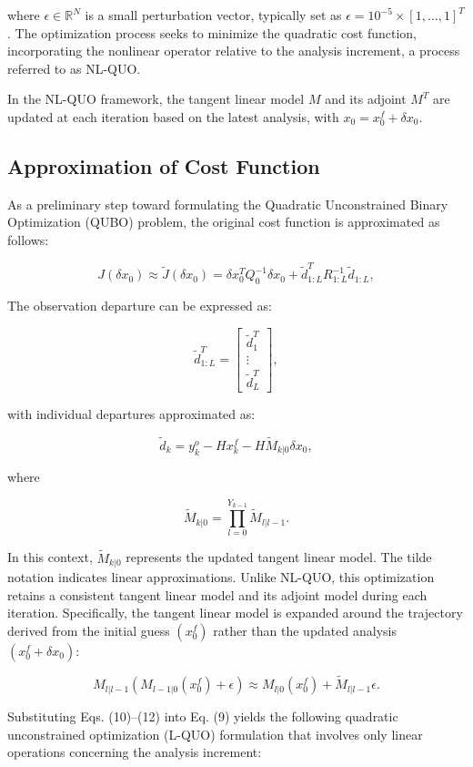 \documentclass{article}
\begin{document}
where \( \epsilon \in \mathbb{R}^N \) is a small perturbation vector, typically set as \( \epsilon = 10^{-5} \times [1,\ldots,1]^T \). The optimization process seeks to minimize the quadratic cost function, incorporating the nonlinear operator relative to the analysis increment, a process referred to as NL-QUO.

In the NL-QUO framework, the tangent linear model \( M \) and its adjoint \( M^T \) are updated at each iteration based on the latest analysis, with \( x_0 = x^f_0 + \delta x_0 \).

\subsection{Approximation of Cost Function}

As a preliminary step toward formulating the Quadratic Unconstrained Binary Optimization (QUBO) problem, the original cost function is approximated as follows:

\[
J (\delta x_0) \approx \tilde{J}(\delta x_0) = \delta x_0^T Q_0^{-1} \delta x_0 + \tilde{d}_{1:L}^T R_{1:L}^{-1} \tilde{d}_{1:L},
\]

The observation departure can be expressed as:

\[
\tilde{d}_{1:L}^T = \begin{bmatrix}
\tilde{d}_1^T \\
\vdots \\
\tilde{d}_L^T
\end{bmatrix},
\]

with individual departures approximated as:

\[
\tilde{d}_k = y^o_k - H x^f_k - H \tilde{M}_{k|0} \delta x_0,
\]

where 

\[
\tilde{M}_{k|0} = \prod_{l=0}^{Y_{k-1}} \tilde{M}_{l|l-1}.
\]

In this context, \( \tilde{M}_{k|0} \) represents the updated tangent linear model. The tilde notation indicates linear approximations. Unlike NL-QUO, this optimization retains a consistent tangent linear model and its adjoint model during each iteration. Specifically, the tangent linear model is expanded around the trajectory derived from the initial guess \( (x^f_0) \) rather than the updated analysis \( (x^f_0 + \delta x_0) \):

\[
M_{l|l-1} \left( M_{l-1|0} \left( x^f_0 \right) + \epsilon \right) \approx M_{l|0} \left( x^f_0 \right) + \tilde{M}_{l|l-1} \epsilon.
\]

Substituting Eqs. (10)–(12) into Eq. (9) yields the following quadratic unconstrained optimization (L-QUO) formulation that involves only linear operations concerning the analysis increment:
\end{document}
